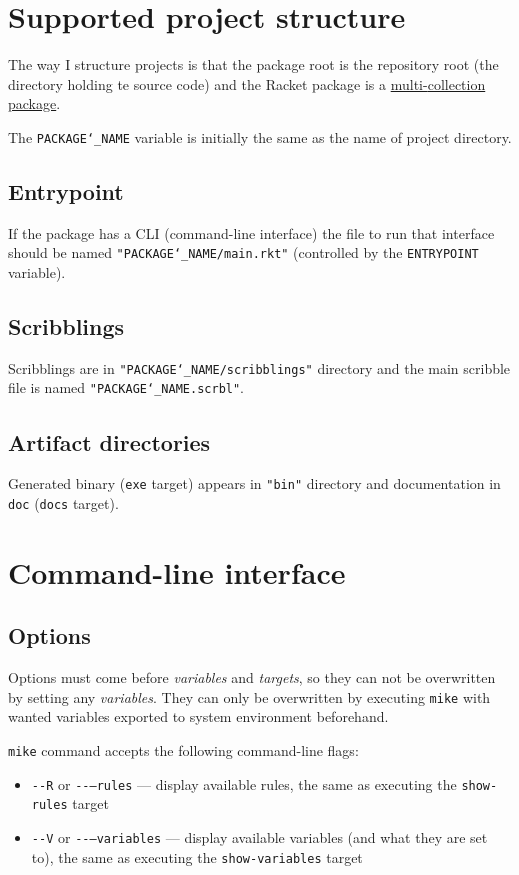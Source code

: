 \documentclass{article}
\newcommand{\sectionNewpage}{}
\newcommand{\Scribtexttt}[1]{{\texttt{#1}}}
\newlength{\stabLeft}
\newcommand{\atItemizeStart}[0]{\addtolength{\stabLeft}{\labelsep}
                                \addtolength{\stabLeft}{\labelwidth}}
\let\SOriginalthesubsection\thesubsection
\let\SOriginalthesubsubsection\thesubsubsection
\newcommand{\Ssection}[2]{\section[#1]{#2}\let\thesubsection\SOriginalthesubsection}
\newcommand{\Ssubsection}[2]{\subsection[#1]{#2}\let\thesubsubsection\SOriginalthesubsubsection}
\newcommand{\Shref}[3]{\href{#1\##2}{#3}}
\renewcommand{\sectionNewpage}{\newpage}
\begin{document}
\sectionNewpage

\Ssection{Supported project structure}{Supported project structure}\label{t:x28part_x22mikex2dprojectx22x29}

The way I structure projects is that the package root is the repository root
(the directory holding te source code)
and the Racket package is a
\Shref{https://docs.racket-lang.org/pkg/Package_Concepts.html?q=\%27multi}{\%28part._concept~3amulti-collection\%29}{multi{-}collection package}.

The \Scribtexttt{PACKAGE{\char`\_}NAME} variable is initially the same
as the name of project directory.

\Ssubsection{Entrypoint}{Entrypoint}\label{t:x28part_x22Entrypointx22x29}

If the package has a CLI (command{-}line interface) the file to run
that interface should be named \Scribtexttt{"PACKAGE{\char`\_}NAME/main{\hbox{\texttt{.}}}rkt"}
(controlled by the \Scribtexttt{ENTRYPOINT} variable).

\Ssubsection{Scribblings}{Scribblings}\label{t:x28part_x22Scribblingsx22x29}

Scribblings are in \Scribtexttt{"PACKAGE{\char`\_}NAME/scribblings"} directory
and the main scribble file is named \Scribtexttt{"PACKAGE{\char`\_}NAME{\hbox{\texttt{.}}}scrbl"}.

\Ssubsection{Artifact directories}{Artifact directories}\label{t:x28part_x22Artifactx5fdirectoriesx22x29}

Generated binary (\Scribtexttt{exe} target) appears in \Scribtexttt{"bin"} directory
and documentation in \Scribtexttt{doc} (\Scribtexttt{docs} target).

\sectionNewpage

\Ssection{Command{-}line interface}{Command{-}line interface}\label{t:x28part_x22mikex2dclix22x29}



\Ssubsection{Options}{Options}\label{t:x28part_x22Optionsx22x29}

Options must come before \textit{variables} and \textit{targets},
so they can not be overwritten by setting any \textit{variables}.
They can only be overwritten by executing \Scribtexttt{mike} with wanted variables
exported to system environment beforehand.

\Scribtexttt{mike} command accepts the following command{-}line flags:

\begin{itemize}\atItemizeStart

\item \mbox{\Scribtexttt{{-}{-}R}} or \mbox{\Scribtexttt{{-}{-}{--}rules}}
{---} display available rules,
the same as executing the \Scribtexttt{show{-}rules} target

\item \mbox{\Scribtexttt{{-}{-}V}} or \mbox{\Scribtexttt{{-}{-}{--}variables}}
{---} display available variables (and what they are set to),
the same as executing the \Scribtexttt{show{-}variables} target\end{itemize}
\end{document}
